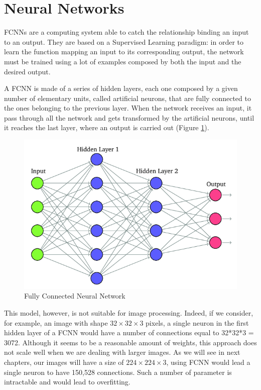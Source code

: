 \section{Neural Networks}
\label{sec:Neural Network}
\acp{FCNN} are a computing system able to catch the relationship binding an input to an output. They are based on a Supervised Learning paradigm: in order to learn the function mapping an input to its corresponding output, the network must be trained using a lot of examples composed by both the input and the desired output. 
\vspace{5mm}

A \ac{FCNN} is made of a series of hidden layers, each one composed by a given number of elementary units, called artificial neurons, that are fully connected to the ones belonging to the previous layer. When the network receives an input, it pass through all the network and gets transformed by the artificial neurons, until it reaches the last layer, where an output is carried out (Figure \ref{fig:third_figure}).
\begin{figure}[htbp!]
\centering
\includegraphics[scale=0.45]{Tesi/images/FCNN}
\caption{Fully Connected Neural Network}
\label{fig:third_figure}
\end{figure}

\vspace{5mm}
This model, however, is not suitable for image processing. Indeed, if we consider, for example, an image with shape $32 \times 32 \times 3$ pixels, a single neuron in the first hidden layer of a \ac{FCNN} would have a number of connections equal to 32*32*3 = 3072. Although it seems to be a reasonable amount of weights, this approach does not scale well when we are dealing with larger images. As we will see in next chapters, our images will have a size of $224 \times 224 \times 3$, using \ac{FCNN} would lead a single neuron to have 150,528 connections. Such a number of parameter is intractable and would lead to overfitting.

